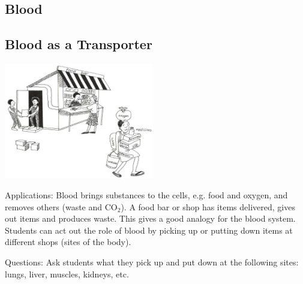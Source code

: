 \begin{multicols}{2}

\section*{Blood}


\subsection{Blood as a Transporter} %

\begin{center}
\includegraphics[width=0.49\textwidth]{./img/vso/blood-transport.jpg}
\end{center}

\begin{description*}
\item[Applications:]{Blood brings substances to the
cells, e.g. food and oxygen, and
removes others (waste and CO$_2$).
A food bar or shop has items
delivered, gives out items and
produces waste. This gives a good
analogy for the blood system.
Students can act out the role of
blood by picking up or putting
down items at different shops
(sites of the body).}
\item[Questions:]{Ask students what they pick up and put down at the following sites: lungs, liver, muscles, kidneys, etc.}
\end{description*}


\end{multicols}
